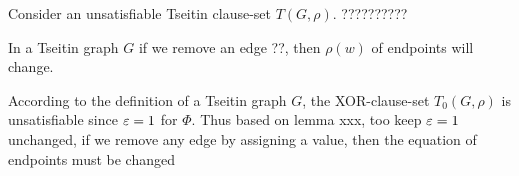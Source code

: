 \documentclass{report}
\begin{document}
Consider an unsatisfiable Tseitin clause-set $T(G,\rho)$. ??????????

\begin{lem}\label{lem:game3}
In a Tseitin graph $G$ if we remove an edge ??, then $\rho(w)$ of endpoints will change. 
\end{lem}
\begin{prf}
According to the definition of a Tseitin graph $G$, the XOR-clause-set $T_0(G,\rho)$ is unsatisfiable since $\varepsilon=1$ for $\Phi$. Thus based on lemma xxx, too keep $\varepsilon=1$ unchanged, if we remove any edge by assigning a value, then the equation of endpoints must be changed
\end{prf}


\newpage


\end{document}
